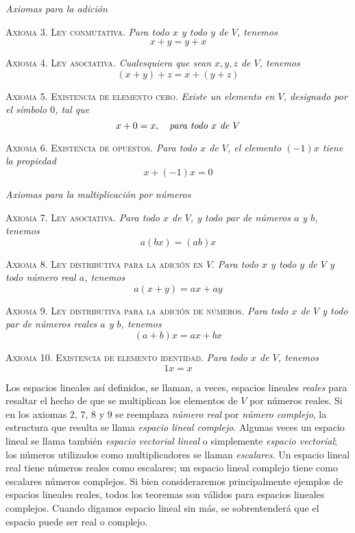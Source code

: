 \vspace{.3cm}
\textit{Axiomas para la adición}

\vspace{.3cm}
\indent\textsc{Axioma 3. Ley conmutativa.} {\it Para todo $x$ y todo $y$ de $V$, tenemos}
$$x+y=y+x$$

\vspace{.3cm}
\indent\textsc{Axioma 4. Ley asociativa.} {\it Cualesquiera que sean $x,y,z$ de $V$, tenemos}
$$(x+y)+z=x+(y+z)$$

\vspace{.3cm}
\indent\textsc{Axioma 5. Existencia de elemento cero.} {\it Existe un elemento en $V$, designado por el símbolo $0$, tal que}
$$x+0=x,\quad\text{\it para todo }x\textit{ de }V$$

\vspace{.3cm}
\indent\textsc{Axioma 6. Existencia de opuestos.} {\it Para todo $x$ de $V$, el elemento $(-1)x$ tiene la propiedad}
$$x+(-1)x=0$$

\vspace{.3cm}
\textit{Axiomas para la multiplicación por números}

\vspace{.3cm}
\indent\textsc{Axioma 7. Ley asociativa}. {\it Para todo $x$ de $V$, y todo par de números $a$ y $b$, tenemos}
$$a(bx)=(ab)x$$

\vspace{.3cm}
\indent\textsc{Axioma 8. Ley distributiva para la adición en $V$.} {\it Para todo $x$ y todo $y$ de $V$ y todo número real $a$, tenemos}
$$a(x+y)=ax+ay$$

\vspace{.3cm}
\indent\textsc{Axioma 9. Ley distributiva para la adición de números.} {\it Para todo $x$ de $V$ y todo par de números reales $a$ y $b$, tenemos}
$$(a+b)x=ax+bx$$

\vspace{.3cm}
\indent\textsc{Axioma 10. Existencia de elemento identidad.} {\it Para todo $x$ de $V$, tenemos}
$$1x=x$$

Los espacios lineales así definidos, se llaman, a veces, espacios lineales {\it reales} para resaltar el hecho de que se multiplican los elementos de $V$ por números reales. Si en los axiomas $2$, $7$, $8$ y $9$ se reemplaza {\it número real} por {\it número complejo}, la estructura que resulta se llama {\it espacio lineal complejo}. Algunas veces un espacio lineal se llama también {\it espacio vectorial lineal} o simplemente {\it espacio vectorial}; los números utilizados como multiplicadores se llaman {\it escalares}. Un espacio lineal real tiene números reales como escalares; un espacio lineal complejo tiene como escalares números complejos. Si bien consideraremos principalmente ejemplos de espacios lineales reales, todos los teoremas son válidos para espacios lineales complejos. Cuando digamos espacio lineal sin más, se sobrentenderá que el espacio puede ser real o complejo.

